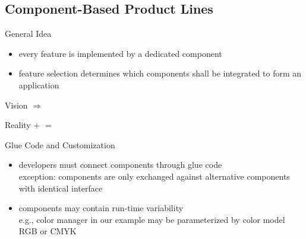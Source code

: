 \subsection{Component-Based Product Lines}
\begin{frame}{\myframetitle} %
	\begin{mycolumns}[t,widths={40}]
		\begin{definition}{General Idea}					
			\begin{itemize}
				\item every feature is implemented by a dedicated component
				\item feature selection determines which components shall be integrated to form an application
			\end{itemize}
		\end{definition}
		\begin{example}{Vision}
				\vspace*{\fill}
					$\Longrightarrow$ 
				\vspace*{\fill}	
		\end{example}
	\mynextcolumn
		\begin{example}{Reality}
				\vspace*{\fill}
					$+$ 
				\vspace*{\fill}	
				\vspace*{\fill}
					$=$ 
				\vspace*{\fill}	
		\end{example}		
		\begin{note}{Glue Code and Customization}
			\begin{itemize}
				\item developers must connect components through glue code\\exception: components are only exchanged against alternative components with identical interface
				\item components may contain run-time variability\\e.g., color manager in our example may be parameterized by color model RGB or CMYK
			\end{itemize}
		\end{note}
	\end{mycolumns}	
\end{frame}

